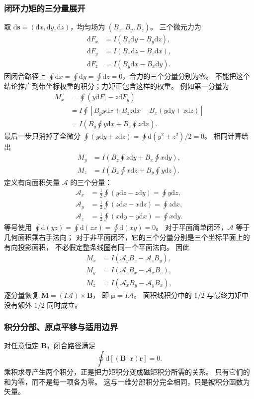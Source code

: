 \documentclass[UTF8,zihao=-4,fontset=fandol,a4paper]{ctexart}
\newcommand{\vect}[1]{\bm{#1}}
\newcommand{\dd}{\mathrm d}
\begin{document}
\subsubsection*{闭环力矩的三分量展开}
取 $\dd\vect s=(\dd x,\dd y,\dd z)$，均匀场为 $(B_x,B_y,B_z)$。
三个微元力为
\[
\begin{aligned}
\dd F_x&=I(B_z\dd y-B_y\dd z),\\
\dd F_y&=I(B_x\dd z-B_z\dd x),\\
\dd F_z&=I(B_y\dd x-B_x\dd y).
\end{aligned}
\]
因闭合路径上 $\oint\dd x=\oint\dd y=\oint\dd z=0$，合力的三个分量分别为零。
不能把这个结论推广到带坐标权重的积分；力矩正包含这样的权重。
例如第一分量为
\[
\begin{aligned}
M_x&=\oint(y\dd F_z-z\dd F_y)\\
&=I\oint[B_y y\dd x+B_z z\dd x-B_x(y\dd y+z\dd z)]\\
&=I\left(B_y\oint y\dd x+B_z\oint z\dd x\right).
\end{aligned}
\]
最后一步只消掉了全微分
$\oint(y\dd y+z\dd z)=\oint\dd(y^2+z^2)/2=0$。
相同计算给出
\[
\begin{aligned}
M_y&=I\left(B_z\oint z\dd y+B_x\oint x\dd y\right),\\
M_z&=I\left(B_x\oint x\dd z+B_y\oint y\dd z\right).
\end{aligned}
\]
定义有向面积矢量 $\vect{\mathcal A}$ 的三个分量：
\[
\begin{aligned}
\mathcal A_x&=\frac12\oint(y\dd z-z\dd y)=\oint y\dd z,\\
\mathcal A_y&=\frac12\oint(z\dd x-x\dd z)=\oint z\dd x,\\
\mathcal A_z&=\frac12\oint(x\dd y-y\dd x)=\oint x\dd y.
\end{aligned}
\]
等号使用 $\oint\dd(yz)=\oint\dd(zx)=\oint\dd(xy)=0$。
对于平面简单闭环，$\vect{\mathcal A}$ 等于几何面积乘右手法向；
对于非平面闭环，它的三个分量分别是三个坐标平面上的有向投影面积，
不必假定整条线圈有同一个平面法向。
因此
\[
\begin{aligned}
M_x&=I(\mathcal A_yB_z-\mathcal A_zB_y),\\
M_y&=I(\mathcal A_zB_x-\mathcal A_xB_z),\\
M_z&=I(\mathcal A_xB_y-\mathcal A_yB_x),
\end{aligned}
\]
逐分量恢复 $\vect M=(I\vect{\mathcal A})\times\vect B$，
即 $\vect\mu=I\vect{\mathcal A}$。
面积线积分中的 $1/2$ 与最终力矩中没有额外 $1/2$ 同时成立。

\subsubsection*{积分分部、原点平移与适用边界}
对任意恒定 $\vect B$，闭合路径满足
\[
\oint\dd[(\vect B\cdot\vect r)\vect r]=0.
\]
乘积求导产生两个积分，正是把力矩积分变成磁矩积分所需的关系。
只有它们的和为零，而不是每一项各为零。
这与一维分部积分完全相同，只是被积分函数为矢量。
\end{document}
